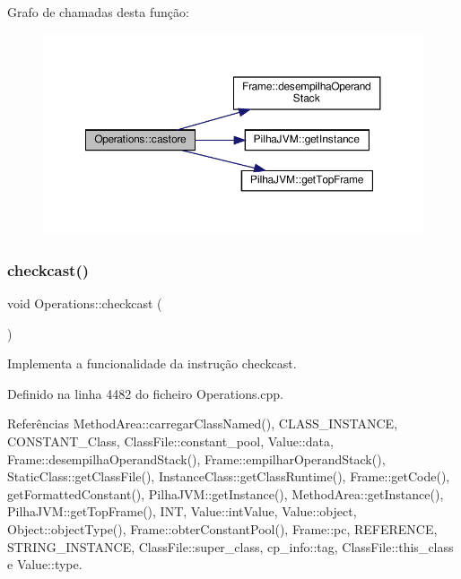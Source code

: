 Grafo de chamadas desta função\+:\nopagebreak
\begin{figure}[H]
\begin{center}
\leavevmode
\includegraphics[width=350pt]{classOperations_a417c4833f2f048350920358961cfab03_cgraph}
\end{center}
\end{figure}
\mbox{\label{classOperations_aa4f0f3c8617af197e4a4e2dc62cb9c35}} 
\subsubsection{\texorpdfstring{checkcast()}{checkcast()}}
{\footnotesize\ttfamily void Operations\+::checkcast (\begin{DoxyParamCaption}{ }\end{DoxyParamCaption})\hspace{0.3cm}{\ttfamily [private]}}



Implementa a funcionalidade da instrução checkcast. 



Definido na linha 4482 do ficheiro Operations.\+cpp.



Referências Method\+Area\+::carregar\+Class\+Named(), C\+L\+A\+S\+S\+\_\+\+I\+N\+S\+T\+A\+N\+CE, C\+O\+N\+S\+T\+A\+N\+T\+\_\+\+Class, Class\+File\+::constant\+\_\+pool, Value\+::data, Frame\+::desempilha\+Operand\+Stack(), Frame\+::empilhar\+Operand\+Stack(), Static\+Class\+::get\+Class\+File(), Instance\+Class\+::get\+Class\+Runtime(), Frame\+::get\+Code(), get\+Formatted\+Constant(), Pilha\+J\+V\+M\+::get\+Instance(), Method\+Area\+::get\+Instance(), Pilha\+J\+V\+M\+::get\+Top\+Frame(), I\+NT, Value\+::int\+Value, Value\+::object, Object\+::object\+Type(), Frame\+::obter\+Constant\+Pool(), Frame\+::pc, R\+E\+F\+E\+R\+E\+N\+CE, S\+T\+R\+I\+N\+G\+\_\+\+I\+N\+S\+T\+A\+N\+CE, Class\+File\+::super\+\_\+class, cp\+\_\+info\+::tag, Class\+File\+::this\+\_\+class e Value\+::type.



